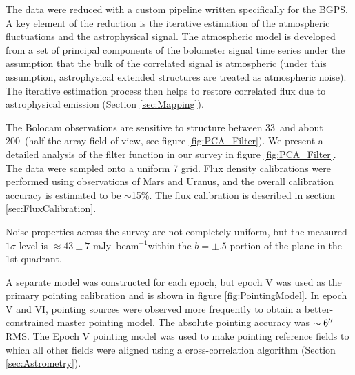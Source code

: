 \documentclass{emulateapj}
\newcommand\jyb{Jy~beam$^{-1}$}
\newcommand{\bcamfwhm}{33\arcsec}
\begin{document}
The data were reduced with a custom pipeline written specifically for
the BGPS.  A key element of the reduction is the iterative estimation
of the atmospheric fluctuations and the astrophysical signal.  The
atmospheric model is developed from a set of principal components of
the bolometer signal time series under the assumption that the bulk of
the correlated signal is atmospheric (under this assumption,
astrophysical extended structures are treated as atmospheric noise).
The iterative estimation process then helps to restore correlated flux
due to astrophysical emission (Section \ref{sec:Mapping}).

The Bolocam observations are sensitive to structure between \bcamfwhm\
and about 200\arcsec\ (half the array field of view, see figure
\ref{fig:PCA_Filter}).  We present a detailed analysis of the filter
function in our survey in figure \ref{fig:PCA_Filter}.  The data were
sampled onto a uniform 7\farcs2 grid.  Flux density calibrations were
performed using observations of Mars and Uranus, and the overall
calibration accuracy is estimated to be $\sim$15\%.  The flux
calibration is described in section \ref{sec:FluxCalibration}.

Noise properties across the survey are not completely uniform, but the
measured $1\sigma$ level is $\approx43\pm7$ m\jyb within the
$b=\pm.5$ portion of the plane in the 1st quadrant.

A separate model was constructed for each epoch, but epoch V was used
as the primary pointing calibration and is shown in figure
\ref{fig:PointingModel}.  In epoch V and VI, pointing sources were
observed more frequently to obtain a better-constrained master
pointing model. The absolute pointing accuracy was $\sim6\mbox{$^{\prime\prime}$}$ RMS.
The Epoch V pointing model was used to make pointing reference fields
to which all other fields were aligned using a cross-correlation
algorithm (Section \ref{sec:Astrometry}).

\end{document}
